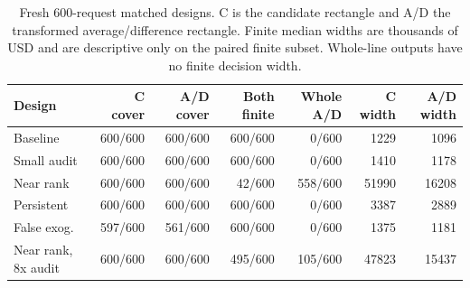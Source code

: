 \begin{table}[htbp]
\centering\small
\caption{Fresh 600-request matched designs. C is the candidate rectangle and A/D the transformed average/difference rectangle. Finite median widths are thousands of USD and are descriptive only on the paired finite subset. Whole-line outputs have no finite decision width.}
\label{tab:sharpening}
\begin{tabular}{lrrrrrr}
\toprule
Design & C cover & A/D cover & Both finite & Whole A/D & C width & A/D width \\
\midrule
Baseline & 600/600 & 600/600 & 600/600 & 0/600 & 1229 & 1096 \\
Small audit & 600/600 & 600/600 & 600/600 & 0/600 & 1410 & 1178 \\
Near rank & 600/600 & 600/600 & 42/600 & 558/600 & 51990 & 16208 \\
Persistent & 600/600 & 600/600 & 600/600 & 0/600 & 3387 & 2889 \\
False exog. & 597/600 & 561/600 & 600/600 & 0/600 & 1375 & 1181 \\
Near rank, 8x audit & 600/600 & 600/600 & 495/600 & 105/600 & 47823 & 15437 \\
\bottomrule
\end{tabular}
\end{table}
